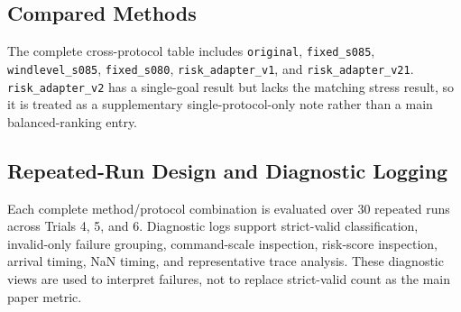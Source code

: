 \subsection{Compared Methods}

The complete cross-protocol table includes \texttt{original},
\texttt{fixed\_s085}, \texttt{windlevel\_s085}, \texttt{fixed\_s080},
\texttt{risk\_adapter\_v1}, and \texttt{risk\_adapter\_v21}.
\texttt{risk\_adapter\_v2} has a single-goal result but lacks the matching
stress result, so it is treated as a supplementary single-protocol-only note
rather than a main balanced-ranking entry.

\subsection{Repeated-Run Design and Diagnostic Logging}

Each complete method/protocol combination is evaluated over 30 repeated runs
across Trials 4, 5, and 6. Diagnostic logs support strict-valid classification,
invalid-only failure grouping, command-scale inspection, risk-score inspection,
arrival timing, NaN timing, and representative trace analysis. These diagnostic
views are used to interpret failures, not to replace strict-valid count as the
main paper metric.
